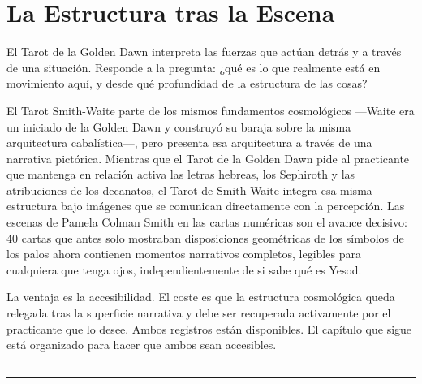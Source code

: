 \section{La Estructura tras la Escena}\label{between-chapters-one-and-two}

El Tarot de la Golden Dawn interpreta las fuerzas que actúan detrás y a través de una situación. Responde a la pregunta: ¿qué es lo que realmente está en movimiento aquí, y desde qué profundidad de la estructura de las cosas?

El Tarot Smith-Waite parte de los mismos fundamentos cosmológicos ---Waite era un iniciado de la Golden Dawn y construyó su baraja sobre la misma arquitectura cabalística---, pero presenta esa arquitectura a través de una narrativa pictórica. Mientras que el Tarot de la Golden Dawn pide al practicante que mantenga en relación activa las letras hebreas, los Sephiroth y las atribuciones de los decanatos, el Tarot de Smith-Waite integra esa misma estructura bajo imágenes que se comunican directamente con la percepción. Las escenas de Pamela Colman Smith en las cartas numéricas son el avance decisivo: 40 cartas que antes solo mostraban disposiciones geométricas de los símbolos de los palos ahora contienen momentos narrativos completos, legibles para cualquiera que tenga ojos, independientemente de si sabe qué es Yesod.

La ventaja es la accesibilidad. El coste es que la estructura cosmológica queda relegada tras la superficie narrativa y debe ser recuperada activamente por el practicante que lo desee. Ambos registros están disponibles. El capítulo que sigue está organizado para hacer que ambos sean accesibles.

\begin{center}\rule{0.5\linewidth}{0.5pt}\end{center}

\begin{center}\rule{0.5\linewidth}{0.5pt}\end{center}
